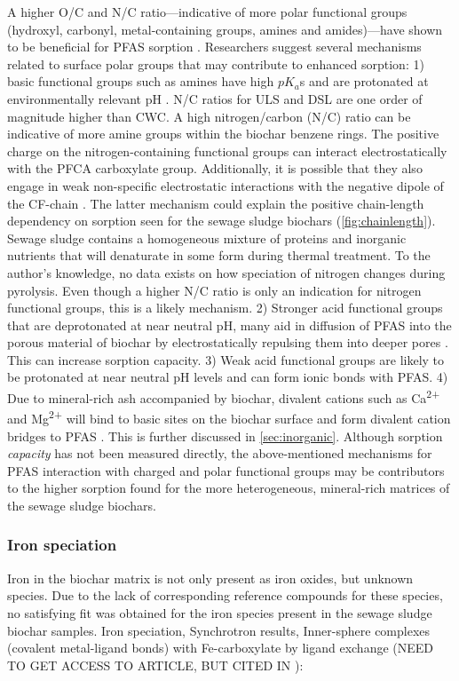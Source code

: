 A higher O/C and N/C ratio---indicative of more polar functional groups (hydroxyl, carbonyl, metal-containing groups, amines and amides)---have shown to be beneficial for PFAS sorption \citep{du2014adsorption}. Researchers suggest several mechanisms related to surface polar groups that may contribute to enhanced sorption: 1) basic functional groups such as amines have high $pK_a$s and are protonated at environmentally relevant pH \citep{deng2010removal}. N/C ratios for ULS and DSL are one order of magnitude higher than CWC. A high nitrogen/carbon (N/C) ratio can be indicative of more amine groups within the biochar benzene rings. The positive charge on the nitrogen-containing functional groups can interact electrostatically with the PFCA carboxylate group. Additionally, it is possible that they also engage in weak non-specific electrostatic interactions with the negative dipole of the CF-chain \citep{xiao2011effects}. The latter mechanism could explain the positive chain-length dependency on sorption seen for the sewage sludge biochars (\cref{fig:chainlength}). Sewage sludge contains a homogeneous mixture of proteins and inorganic nutrients that will denaturate in some form during thermal treatment. To the author's knowledge, no data exists on how speciation of nitrogen changes during pyrolysis. Even though a higher N/C ratio is only an indication for nitrogen functional groups, this is a likely mechanism. 2) Stronger acid functional groups that are deprotonated at near neutral pH, many aid in diffusion of PFAS into the porous material of biochar by electrostatically repulsing them into deeper pores \citep{du2014adsorption}. This can increase sorption capacity. 3) Weak acid functional groups are likely to be protonated at near neutral pH levels and can form ionic bonds with PFAS. 4) Due to mineral-rich ash accompanied by biochar, divalent cations such as Ca\textsuperscript{2+} and Mg\textsuperscript{2+} will bind to basic sites on the biochar surface and form divalent cation bridges to PFAS \citep{higgins2006sorption}. This is further discussed in \cref{sec:inorganic}. Although sorption \textit{capacity} has not been measured directly, the above-mentioned mechanisms for PFAS interaction with charged and polar functional groups may be contributors to the higher sorption found for the more heterogeneous, mineral-rich matrices of the sewage sludge biochars. 

\subsubsection{Iron speciation}
Iron in the biochar matrix is not only present as iron oxides, but unknown species. Due to the lack of corresponding reference compounds for these species, no satisfying fit was obtained for the iron species present in the sewage sludge biochar samples. 
Iron speciation, Synchrotron results, Inner-sphere complexes (covalent metal-ligand bonds) with Fe-carboxylate by ligand exchange \citep{gao2012adsorption}(NEED TO GET ACCESS TO ARTICLE, BUT CITED IN \citep{du2014adsorption}):

